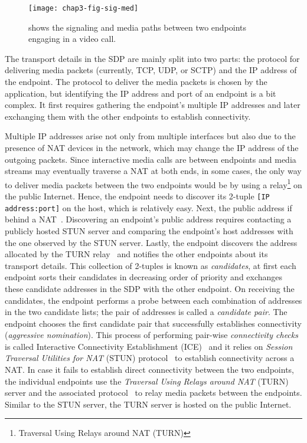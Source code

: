 \begin{figure}[!h]
\centerline{\texttt{[image: chap3-fig-sig-med]}}
\caption{shows the signaling and media paths between two endpoints engaging in
a video call.}
\label{fig:3:sig.media}
\end{figure}


The transport details in the SDP are mainly split into two parts: the protocol
for delivering media packets (currently, TCP, UDP, or SCTP) and the 
IP address of the endpoint. The protocol to deliver the media packets is
chosen by the application, but identifying the IP address and port of an
endpoint is a bit complex. It first requires gathering the endpoint's multiple
IP addresses and later exchanging them with the other endpoints to establish
connectivity.

Multiple IP addresses arise not only from multiple interfaces but also due to
the presence of NAT devices in the network, which may change the IP address of
the outgoing packets. Since interactive media calls are between endpoints and
media streams may eventually traverse a NAT at both ends, in some cases, the
only way to deliver media packets between the two endpoints would be by using
a relay\footnote{Traversal Using Relays around NAT (TURN)} on the public
Internet. Hence, the endpoint needs to discover its 2-tuple \texttt{[IP
address:port]} on the host, which is relatively easy. Next, the public address
if behind a NAT~\cite{rfc5389}. Discovering an endpoint's public address
requires contacting a publicly hosted STUN server and comparing the endpoint's
host addresses with the one observed by the STUN server. Lastly, the endpoint
discovers the address allocated by the TURN relay~\cite{rfc5766} and notifies
the other endpoints about its transport details. This collection of 2-tuples
is known as \emph{candidates}, at first each endpoint sorts their candidates
in decreasing order of priority and exchanges these candidate addresses in the
SDP with the other endpoint. On receiving the candidates, the endpoint
performs a probe between each combination of addresses  in the two candidate
lists; the pair of addresses is called a \emph{candidate pair}. The endpoint
chooses the first candidate pair that successfully establishes connectivity
(\emph{aggressive nomination}). This process of performing pair-wise
\emph{connectivity checks} is called Interactive Connectivity Establishment
(ICE)~\cite{rfc5245, rfc6544} and it relies on \emph{Session Traversal
Utilities for NAT} (STUN) protocol~\cite{rfc5389} to establish connectivity
across a NAT. In case it fails to establish direct connectivity between the
two endpoints, the individual endpoints use the \emph{Traversal Using Relays
around NAT} (TURN) server and the associated protocol~\cite{rfc5766} to relay
media packets between the endpoints. Similar to the STUN server, the TURN
server is hosted on the public Internet.

